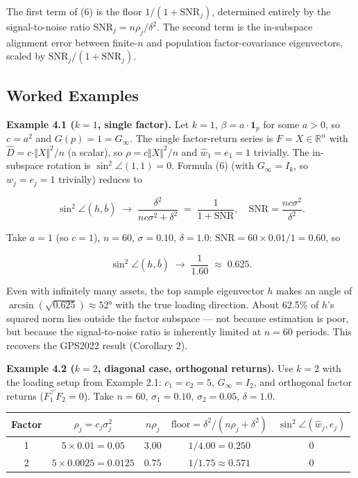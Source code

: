 \documentclass{article}
\theoremstyle{remark}
\begin{document}
The first term of (6) is the floor $1/(1+\mathrm{SNR}_j)$, determined entirely by the signal-to-noise ratio $\mathrm{SNR}_j = n\rho_j/\delta^2$. The second term is the in-subspace alignment error between finite-$n$ and population factor-covariance eigenvectors, scaled by $\mathrm{SNR}_j/(1+\mathrm{SNR}_j)$.

\subsection{Worked Examples}

\textbf{Example 4.1 ($k=1$, single factor).} Let $k=1$, $\beta = a\cdot\mathbf{1}_p$ for some $a > 0$, so $c = a^2$ and $G(p) = 1 = G_\infty$. The single factor-return series is $F = X\in\mathbb{R}^n$ with $\hat{D} = c\cdot\Vert X\Vert^2/n$ (a scalar), so $\rho = c\Vert X\Vert^2/n$ and $\hat{w}_1 = e_1 = 1$ trivially. The in-subspace rotation is $\sin^2\angle(1, 1) = 0$. Formula (6) (with $G_\infty = I_k$, so $w_j = e_j = 1$ trivially) reduces to

\[
\sin^2\angle(h, \bar{b}) \;\to\; \frac{\delta^2}{nc\sigma^2 + \delta^2} \;=\; \frac{1}{1 + \mathrm{SNR}},\quad \mathrm{SNR} = \frac{nc\sigma^2}{\delta^2}.
\]

Take $a = 1$ (so $c = 1$), $n = 60$, $\sigma = 0.10$, $\delta = 1.0$: $\mathrm{SNR} = 60\times 0.01/1 = 0.60$, so

\[
\sin^2\angle(h, \bar{b}) \;\to\; \frac{1}{1.60} \;\approx\; 0.625.
\]

Even with infinitely many assets, the top sample eigenvector $h$ makes an angle of $\arcsin(\sqrt{0.625})\approx 52°$ with the true loading direction. About 62.5\% of $h$'s squared norm lies outside the factor subspace — not because estimation is poor, but because the signal-to-noise ratio is inherently limited at $n=60$ periods. This recovers the GPS2022 result (Corollary 2).

\textbf{Example 4.2 ($k=2$, diagonal case, orthogonal returns).} Use $k=2$ with the loading setup from Example 2.1: $c_1 = c_2 = 5$, $G_\infty = I_2$, and orthogonal factor returns ($F_1^\top F_2 = 0$). Take $n = 60$, $\sigma_1 = 0.10$, $\sigma_2 = 0.05$, $\delta = 1.0$.

\begin{center}
\begin{tabular}{|c|c|c|c|c|}
\hline
Factor & $\rho_j = c_j\sigma_j^2$ & $n\rho_j$ & $\text{floor} = \delta^2/(n\rho_j + \delta^2)$ & $\sin^2\angle(\hat{w}_j, e_j)$ \\
\hline
1 & $5\times0.01 = 0.05$ & $3.00$ & $1/4.00 = 0.250$ & $0$ \\
\hline
2 & $5\times0.0025 = 0.0125$ & $0.75$ & $1/1.75 \approx 0.571$ & $0$ \\
\hline
\end{tabular}
\end{center}
\end{document}
